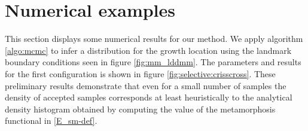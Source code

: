 \documentclass[runningheads]{llncs}
\begin{document}
\section{Numerical examples}\label{sec:numerical}

This section displays some numerical results for our method. We apply algorithm
\ref{algo:mcmc} to infer a distribution for the growth location using the
landmark boundary conditions seen in figure \ref{fig:mm_lddmm}.  The parameters
and results for the first configuration is shown in figure
\ref{fig:selective:crisscross}. These preliminary results demonstrate that even
for a small number of samples the density of accepted samples corresponds at
least heuristically to the analytical density histogram obtained by computing
the value of the metamorphosis functional in \eqref{E_sm-def}.
\end{document}
